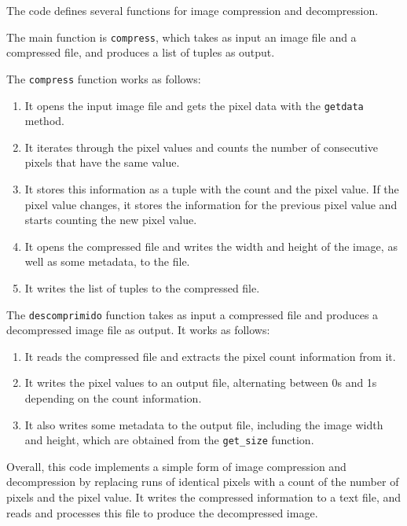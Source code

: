 The code defines several functions for image compression and decompression. 

The main function is \texttt{compress}, which takes as input an image file and a compressed file, and produces a list of tuples as output. 

The \texttt{compress} function works as follows:

\begin{enumerate}
    \item It opens the input image file and gets the pixel data with the \texttt{getdata} method.
    \item It iterates through the pixel values and counts the number of consecutive pixels that have the same value.
    \item It stores this information as a tuple with the count and the pixel value. If the pixel value changes, it stores the information for the previous pixel value and starts counting the new pixel value.
    \item It opens the compressed file and writes the width and height of the image, as well as some metadata, to the file.
    \item It writes the list of tuples to the compressed file.
\end{enumerate}

The \texttt{descomprimido} function takes as input a compressed file and produces a decompressed image file as output. It works as follows:

\begin{enumerate}
    \item It reads the compressed file and extracts the pixel count information from it.
    \item It writes the pixel values to an output file, alternating between 0s and 1s depending on the count information.
    \item It also writes some metadata to the output file, including the image width and height, which are obtained from the \texttt{get\_size} function.
\end{enumerate}

Overall, this code implements a simple form of image compression and decompression by replacing runs of identical pixels with a count of the number of pixels and the pixel value. It writes the compressed information to a text file, and reads and processes this file to produce the decompressed image.

